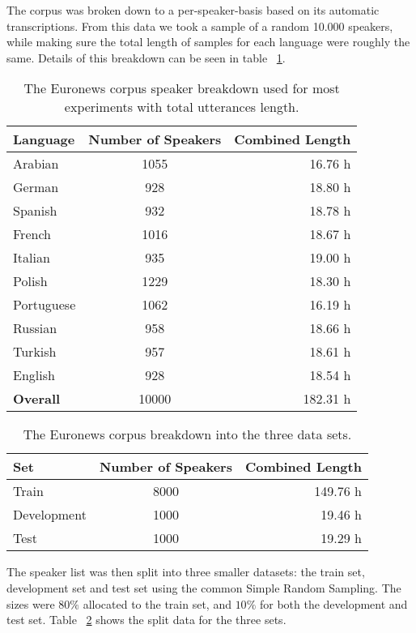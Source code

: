 The corpus was broken down to a per-speaker-basis based on its automatic transcriptions. From this data we took a sample of a random 10.000 speakers, while making sure the total length of samples for each language were roughly the same. Details of this breakdown can be seen in table ~\ref{tab:spkData}.

\begin{table}[h!]
\label{tab:spkData}
\centering
\begin{tabular}{| l | c | r | }
	\hline
	\textbf{Language} & \textbf{Number of Speakers} & \textbf{Combined Length} \\
	\hline
	Arabian & 1055 & 16.76 h \\
	German & 928 & 18.80 h \\
	Spanish & 932 & 18.78 h \\
	French & 1016 & 18.67 h \\  
	Italian & 935 & 19.00 h \\  
	Polish & 1229 & 18.30 h \\ 
	Portuguese & 1062 & 16.19 h \\ 
	Russian & 958 & 18.66 h \\ 
	Turkish & 957 & 18.61 h \\  
	English & 928 & 18.54 h \\ 
	\hline
	\textbf{Overall} & 10000 & 182.31 h\\
	\hline
	
\end{tabular}
\caption{The Euronews corpus speaker breakdown used for most experiments with total utterances length.}
\end{table}

\begin{table}[h!]
\label{tab:spkSplit}
\centering
\begin{tabular}{| l | c | r | }
	\hline
	\textbf{Set} & \textbf{Number of Speakers} & \textbf{Combined Length} \\
	\hline
	Train &  8000 & 149.76 h \\
	Development & 1000 & 19.46 h \\
	Test & 1000 & 19.29 h \\
	\hline
\end{tabular}
\caption{The Euronews corpus breakdown into the three data sets.}
\end{table}

The speaker list was then split into three smaller datasets: the train set, development set and test set using the common Simple Random Sampling. The sizes were \(80\%\) allocated to the train set, and \(10\%\) for both the development and test set. Table ~\ref{tab:spkSplit} shows the split data for the three sets. 


